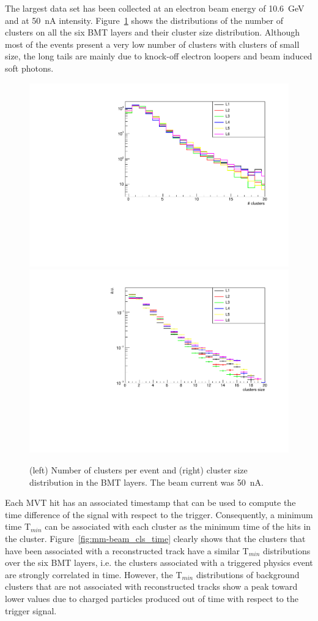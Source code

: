 The largest data set has been collected at an electron beam energy of 10.6~GeV and at 50~nA intensity.
Figure~\ref{fig:mm-beam_cls} shows the distributions of the number of clusters on all the six BMT layers and their cluster size
distribution. Although most of the events present a very low number of clusters with clusters of small size, the long tails are mainly
due to knock-off electron loopers and beam induced soft photons.

\begin{figure}[htb]
 \includegraphics[width=.49\columnwidth,keepaspectratio]{images/beam_num_cls.pdf}
 \includegraphics[width=.49\columnwidth,keepaspectratio]{images/beam_cls_size.pdf}
 \caption{(left) Number of clusters per event and (right) cluster size distribution in the BMT layers. The beam current was 50~nA.}
 \label{fig:mm-beam_cls}
\end{figure}

Each MVT hit has an associated timestamp that can be used to compute the time difference of the signal with respect to the
trigger. Consequently, a minimum time T$_{min}$ can be associated with each cluster as the minimum time of the hits in the cluster.
Figure~\ref{fig:mm-beam_cls_time} clearly shows that the clusters that have been associated with a reconstructed track have
a similar T$_{min}$ distributions over the six BMT layers, i.e. the clusters associated with a triggered physics event are strongly
correlated in time. However, the T$_{min}$ distributions of background clusters that are not associated with reconstructed tracks
show a peak toward lower values due to charged particles produced out of time with respect to the trigger signal.

